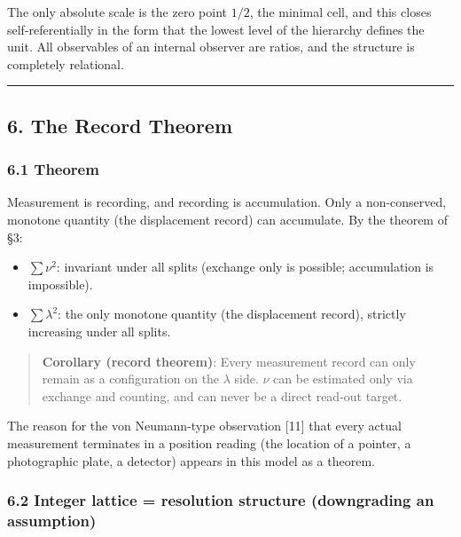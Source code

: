 \documentclass[
]{ltjsarticle}
\providecommand{\tightlist}{%
  \setlength{\itemsep}{0pt}\setlength{\parskip}{0pt}}
\begin{document}
The only absolute scale is the zero point \(1/2\), the minimal cell, and
this closes self-referentially in the form that the lowest level of the
hierarchy defines the unit. All observables of an internal observer are
ratios, and the structure is completely relational.

\begin{center}\rule{0.5\linewidth}{0.5pt}\end{center}

\subsection{6. The Record Theorem}\label{the-record-theorem}

\subsubsection{6.1 Theorem}\label{theorem}

Measurement is recording, and recording is accumulation. Only a
non-conserved, monotone quantity (the displacement record) can
accumulate. By the theorem of §3:

\begin{itemize}
\tightlist
\item
  \(\sum\nu^2\): invariant under all splits (exchange only is possible;
  accumulation is impossible).
\item
  \(\sum\lambda^2\): the only monotone quantity (the displacement
  record), strictly increasing under all splits.
\end{itemize}

\begin{quote}
\textbf{Corollary (record theorem)}: Every measurement record can only
remain as a configuration on the \(\lambda\) side. \(\nu\) can be
estimated only via exchange and counting, and can never be a direct
read-out target.
\end{quote}

The reason for the von Neumann-type observation {[}11{]} that every
actual measurement terminates in a position reading (the location of a
pointer, a photographic plate, a detector) appears in this model as a
theorem.

\subsubsection{6.2 Integer lattice = resolution structure (downgrading
an
assumption)}\label{integer-lattice-resolution-structure-downgrading-an-assumption}
\end{document}

